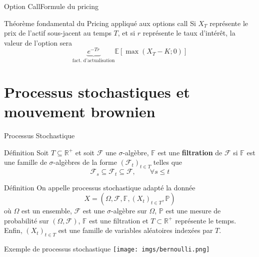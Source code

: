 \documentclass{beamer}
\newcommand{\1}{\mathmybb{1}}
\begin{document}
\begin{frame}{Option Call}{Formule du pricing}
\begin{block}{Théorème fondamental du Pricing appliqué aux options call}
    Si $X_T$  représente le prix de l'actif sous-jacent au temps $T$, et si $r$ représente le taux d'intérêt, la valeur de l'option sera
    \begin{equation} \label{tfp}
      \underbrace{e^{-Tr}}_{\text{fact. d'actualisation}}\mathbb{E}\left[ \max \left(X_{T} - K; 0 \right) \right]
    \end{equation}
  \end{block}
\end{frame}
\section{Processus stochastiques et mouvement brownien}
\begin{frame}{Processus Stochastique}
  \begin{block}{Définition}
    Soit $T \subseteq \mathbb{R}^{+}$ et soit $\mathcal{F}$ une $\sigma$-algèbre, $\mathbb{F}$ est une \textbf{filtration} de $\mathcal{F}$ si $\mathbb{F}$ est une famille de $\sigma$-algèbres de la forme $\left( \mathcal{F}_{t}\right)_{t\in T}$ telles que
    \[
      \mathcal{F}_{s} \subseteq \mathcal{F}_{t} \subseteq \mathcal{F}, \qquad \forall s \leq t
    \]
    \end{block}
  \begin{block}{Définition}
    On appelle processus stochastique adapté la donnée
    \begin{equation}
      X = (\varOmega, \mathcal{F}, \mathbb{F}, \left(  X_{t} \right)_{t\in T}, \mathbb{P})
    \end{equation}
    où $ \varOmega $ est un ensemble, $ \mathcal{F} $ est une $\sigma$-algèbre sur $ \varOmega $, $\mathbb{P}$ est une mesure de probabilité sur $ \left( \varOmega , \mathcal{F} \right)$, $\mathbb{F}$ est une filtration et $T \subset \mathbb{R}^{+}$ représente le temps.
    Enfin, $\left( X_{t} \right)_{t\in T} $  est une famille de variables aléatoires indexées par $ T $.
  \end{block}
\end{frame}
\begin{frame}{Exemple de processus stochastique}
  \texttt{[image: imgs/bernoulli.png]}
\end{frame}
\end{document}
